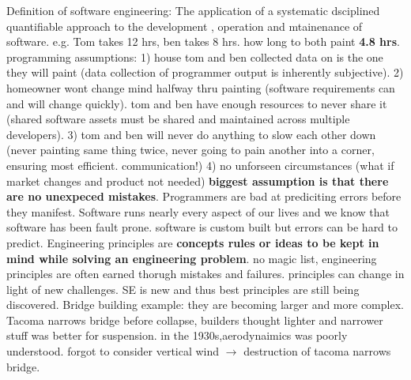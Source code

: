 \documentclass[10pt]{article}
\begin{document}
\begin{landscape}
\begin{multicols*}{6}
\tiny
Definition of software engineering: The application of a systematic dsciplined quantifiable approach to the development , operation and mtainenance of software. e.g. Tom takes 12 hrs, ben takes 8 hrs. how long to both paint \textbf{4.8 hrs}.
programming assumptions:  1) house tom and ben collected data on is the one they will paint (data collection of programmer output is inherently subjective). 2) homeowner wont change mind halfway thru painting (software requirements can and will change quickly). tom and ben have enough resources to never share it (shared software assets must be shared and maintained across multiple developers). 3) tom and ben will never do anything to slow each other down (never painting same thing twice, never going to pain another into a corner, ensuring most efficient. communication!) 4) no unforseen circumstances (what if market changes and product not needed) \textbf{biggest assumption is that there are no unexpeced mistakes}.
Programmers are bad at prediciting errors before they manifest. Software runs nearly every aspect of our lives and we know that software has been fault prone. software is custom built but errors can be hard to predict.
Engineering principles are \textbf{concepts rules or ideas to be kept in mind while solving an engineering problem}. no magic list, engineering principles are often earned thorugh mistakes and failures. principles can change in light of new challenges. SE is new and thus best principles are still being discovered. Bridge building example: they are becoming larger and more complex. Tacoma narrows bridge before collapse, builders thought lighter and narrower stuff was better for suspension. in the 1930s,aerodynaimics was poorly understood. forgot to consider vertical wind $\rightarrow$ destruction of tacoma narrows bridge.

\end{multicols*}
\end{landscape}
\end{document}
